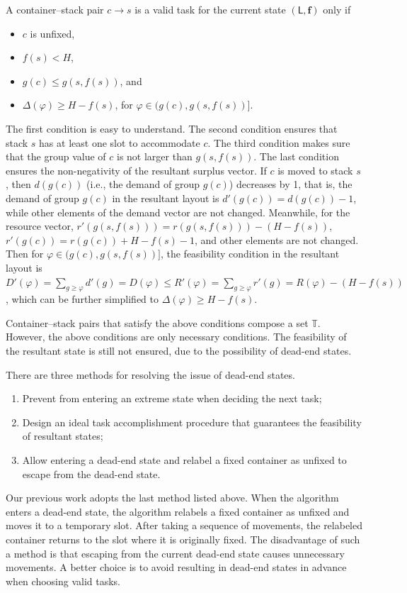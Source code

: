 \documentclass[review,3p,times,12pt,number]{elsarticle}\usepackage{amsmath}\usepackage{amssymb}
\begin{document}
A container--stack pair $c\rightarrow s$ is a valid task for the current state $(\mathsf{L},\boldsymbol{f})$ only if
\begin{itemize}
\item $c$ is unfixed,
\item $f(s)<H$,
\item $g(c)\le g(s,f(s))$, and
\item $\Delta(\varphi)\ge H-f(s)$, for $\varphi\in (g(c),g(s,f(s))]$.
\end{itemize}
The first condition is easy to understand. The second condition ensures that stack $s$ has at least one slot to accommodate $c$.
The third condition makes sure that the group value of $c$ is not larger than $g(s,f(s))$.
The last condition ensures the non-negativity of the resultant surplus vector.
If $c$ is moved to stack $s$, then $d(g(c))$ (i.e., the demand of group $g(c)$) decreases by 1, that is, the demand of group $g(c)$ in the resultant layout is $d'(g(c))=d(g(c))-1$, while other elements of the demand vector are not changed.
Meanwhile, for the resource vector, $r'(g(s,f(s)))=r(g(s,f(s)))-(H-f(s))$, $r'(g(c))=r(g(c))+H-f(s)-1$, and other elements are not changed. Then for $\varphi\in (g(c),g(s,f(s))]$, the feasibility condition in the resultant layout is $D'(\varphi)=\sum_{g\ge \varphi}d'(g)=D(\varphi)\le R'(\varphi)=\sum_{g\ge\varphi}r'(g)=R(\varphi)-(H-f(s))$, which can be further simplified to $\Delta(\varphi)\ge H-f(s)$.

Container--stack pairs that satisfy the above conditions compose a set $\mathbb T$. However, the above conditions are only necessary conditions. The feasibility of the resultant state is still not ensured, due to the possibility of dead-end states.

There are three methods for resolving the issue of dead-end states.
\begin{enumerate}
\item Prevent from entering an extreme state when deciding the next task;
\item Design an ideal task accomplishment procedure that guarantees the feasibility of resultant states;
\item Allow entering a dead-end state and relabel a fixed container as unfixed to escape from the dead-end state.
\end{enumerate}

Our previous work \citep{wang2015} adopts the last method listed above. When the algorithm enters a dead-end state, the algorithm relabels a fixed container as unfixed and moves it to a temporary slot. After taking a sequence of movements, the relabeled container returns to the slot where it is originally fixed. The disadvantage of such a method is that escaping from the current dead-end state causes unnecessary movements. A better choice is to avoid resulting in dead-end states in advance when choosing valid tasks.
\end{document}
